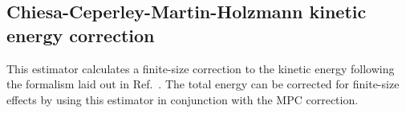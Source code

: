 

\subsection{Chiesa-Ceperley-Martin-Holzmann kinetic energy correction}

This estimator calculates a finite-size correction to the kinetic energy following the formalism laid out in Ref.~\cite{Chiesa2006}.  The total energy can be corrected for finite-size effects by using this estimator in conjunction with the MPC correction.

